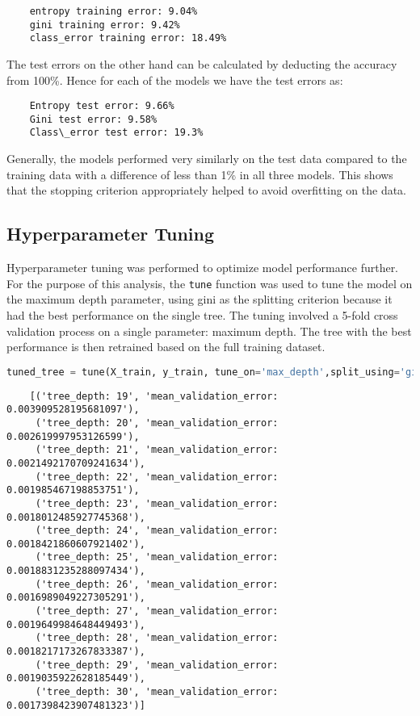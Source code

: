 \documentclass{article}
\begin{document}
\begin{lstlisting}
    entropy training error: 9.04%
    gini training error: 9.42%
    class_error training error: 18.49%
\end{lstlisting}

The test errors on the other hand can be calculated by deducting the accuracy from 100\%. Hence for each of the models we have the test errors as:

\begin{lstlisting}
    Entropy test error: 9.66%
    Gini test error: 9.58%
    Class\_error test error: 19.3%
\end{lstlisting}

Generally, the models performed very similarly on the test data compared to the training data with a difference of less than 1\% in all three models. This shows that the stopping criterion appropriately helped to avoid overfitting on the data.

\subsection{Hyperparameter Tuning}

Hyperparameter tuning was performed to optimize model performance further. For the purpose of this analysis, the \texttt{tune} function was used to tune the model on the maximum depth parameter, using gini as the splitting criterion because it had the best performance on the single tree. The tuning involved a 5-fold cross validation process on a single parameter: maximum depth. The tree with the best performance is then retrained based on the full training dataset.

\begin{lstlisting}[language=Python, caption=Hyperparameter Tuning, label=code:retrain_tree]
tuned_tree = tune(X_train, y_train, tune_on='max_depth',split_using='gini', start=19, stop=31)
\end{lstlisting}

\begin{lstlisting}
    [('tree_depth: 19', 'mean_validation_error: 0.003909528195681097'),
     ('tree_depth: 20', 'mean_validation_error: 0.002619997953126599'),
     ('tree_depth: 21', 'mean_validation_error: 0.0021492170709241634'),
     ('tree_depth: 22', 'mean_validation_error: 0.001985467198853751'),
     ('tree_depth: 23', 'mean_validation_error: 0.0018012485927745368'),
     ('tree_depth: 24', 'mean_validation_error: 0.0018421860607921402'),
     ('tree_depth: 25', 'mean_validation_error: 0.0018831235288097434'),
     ('tree_depth: 26', 'mean_validation_error: 0.0016989049227305291'),
     ('tree_depth: 27', 'mean_validation_error: 0.0019649984648449493'),
     ('tree_depth: 28', 'mean_validation_error: 0.0018217173267833387'),
     ('tree_depth: 29', 'mean_validation_error: 0.0019035922628185449'),
     ('tree_depth: 30', 'mean_validation_error: 0.0017398423907481323')]
\end{lstlisting}
\end{document}
